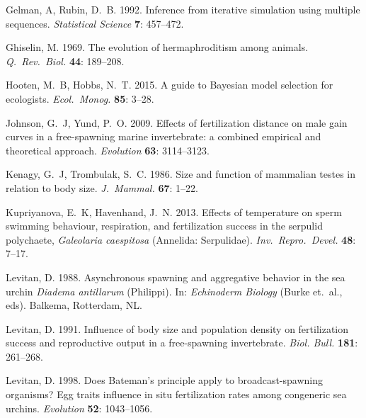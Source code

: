 \documentclass{article}
\begin{document}
\begin{thebibliography}{}
Gelman, A, Rubin, D.~B. 1992.
\newblock Inference from iterative simulation using multiple sequences.
\newblock \textit{Statistical Science} \textbf{7}: 457--472.

Ghiselin, M. 1969.
\newblock The evolution of hermaphroditism among animals.
\newblock \textit{Q.~Rev.~Biol.} \textbf{44}: 189--208.

Hooten, M.~B, Hobbs, N.~T. 2015.
\newblock A guide to Bayesian model selection for ecologists.
\newblock \textit{Ecol.~Monog.} \textbf{85}: 3--28.

Johnson, G.~J, Yund, P.~O. 2009.
\newblock Effects of fertilization distance on male gain curves in a free-spawning marine invertebrate: a combined empirical and theoretical approach.
\newblock \textit{Evolution} \textbf{63}: 3114--3123.

Kenagy, G.~J, Trombulak, S.~C. 1986.
\newblock Size and function of mammalian testes in relation to body size.
\newblock \textit{J.~Mammal.} \textbf{67}: 1--22.

Kupriyanova, E.~K, Havenhand, J.~N. 2013.
\newblock Effects of temperature on sperm swimming behaviour, respiration, and fertilization success in the serpulid polychaete, \textit{Galeolaria caespitosa} (Annelida: Serpulidae).
\newblock \textit{Inv.~Repro.~Devel.} \textbf{48}: 7--17.

Levitan, D. 1988.
\newblock Asynchronous spawning and aggregative behavior in the sea urchin \textit{Diadema antillarum} (Philippi).
\newblock In: \textit{Echinoderm Biology} (Burke et.~al., eds). Balkema, Rotterdam, NL.

Levitan, D. 1991.
\newblock Influence of body size and population density on fertilization success and reproductive output in a free-spawning invertebrate.
\newblock \textit{Biol. Bull.} \textbf{181}: 261--268.

Levitan, D. 1998.
\newblock Does Bateman's principle apply to broadcast-spawning organisms? Egg traits influence in situ fertilization rates among congeneric sea urchins.
\newblock \textit{Evolution} \textbf{52}: 1043--1056.


\end{thebibliography}
\end{document}

